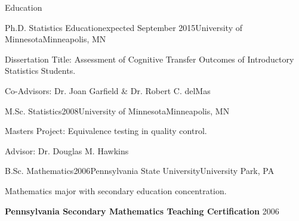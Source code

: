 \documentclass{resume} %
\begin{document}

\begin{rSection}{Education}

\begin{rSubsection}{Ph.D. Statistics Education}{expected September 2015}{University of Minnesota}{Minneapolis, MN}
	\item[] Dissertation Title: Assessment of Cognitive Transfer Outcomes of Introductory Statistics Students.
	\item[] Co-Advisors: Dr. Joan Garfield \& Dr. Robert C. delMas 
\end{rSubsection}

\begin{rSubsection}{M.Sc. Statistics}{2008}{University of Minnesota}{Minneapolis, MN}
	\item[] Masters Project: Equivalence testing in quality control.
	\item[] Advisor: Dr. Douglas M. Hawkins 
\end{rSubsection}

\begin{rSubsection}{B.Sc. Mathematics}{2006}{Pennsylvania State University}{University Park, PA}
	\item[] Mathematics major with secondary education concentration.
\end{rSubsection}

\textbf{Pennsylvania Secondary Mathematics Teaching Certification} \hfill 2006
\vspace{0.5em}

\end{rSection}

\end{document}
